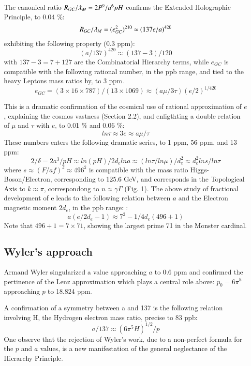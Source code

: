 \documentclass[twoside,draft]{article}
\begin{document}
\begin{sloppypar}
{The canonical ratio $R_{GC}/\lambdabar_M = 2P^9/a^6pH $ confirms the Extended Holographic Principle, to 0.04 \%:
\begin{equation}
R_{GC}/\lambdabar_M  = (e_{GC}^2)^{210}  \approx (137e/a)^{420}  
\end{equation}
exhibiting the following property (0.3 ppm):
 $$ (a/137)^{420} \approx (137 - 3)/120 $$  
with $137 - 3 = 7 + 127$ are the Combinatorial Hierarchy terms, while $e_{GC}$ is compatible with the following rational number, in the ppb range, and tied to the heavy Leptons mass ratios by, to 3 ppm.
$$e_{GC} = (3 \times 16 \times 787)/(13 \times 1069) \approx (a\mu/3\tau) (e/2)^{1/420}$$

This is a dramatic confirmation of the cosmical use of rational approximation of $e$, explaining the cosmos vastness (Section 2.2), and enligthting a double relation of $\mu$ and $\tau$ with $e$, to 0.01 \% and 0.06 \%:
\begin{equation}
ln\tau \approx 3e \approx a\mu/\tau 
\end{equation}
These numbers enters the following dramatic series, to 1 ppm, 56 ppm, and 13 ppm:
\begin{equation}
2/\delta = 2a^3/pH \approx ln(pH)/2d_e lna \approx (ln\tau/ln\mu)/d_e^2 \approx d_e^2 ln s/ln\tau
\end{equation}
where $s \approx (F/af)^2 \approx 496^2 $ is compatible with the mass ratio Higgs-Boson/Electron, corresponding to 125.6 GeV, and corresponds in the Topological Axis to $k \approx \pi $, correspondong to $n \approx \gamma \Gamma$ (Fig. 1).
The above study of fractional development of e leads to the following relation between $a$ and the Electron magnetic moment $2d_e$, in the ppb range: :$$a(e/2d_e-1) \approx 7^2-1/4d_e(496+1)$$ Note that $496 + 1 = 7 \times 71$, showing the largest prime 71 in the Monster cardinal.


\subsection {Wyler's approach}
Armand Wyler singularized a value approaching $a$ to 0.6 ppm and confirmed the pertinence
of the Lenz approximation which plays a central role above: $p_{0} = 6\pi^{5}$ approaching $p$ to 18.824 ppm.

A confirmation of a symmetry between a and 137 is the following relation involving H, the
Hydrogen electron mass ratio, precise to 83 ppb:
$$a/137 \approx (6\pi^{5} H)^{1/2} /p$$
One observe that the rejection of Wyler's work, due to a non-perfect formula for the $p$ and $a$ values, is a new
manifestation of the general neglectance of the Hierarchy Principle.

}
\end{sloppypar}
\end{document}
